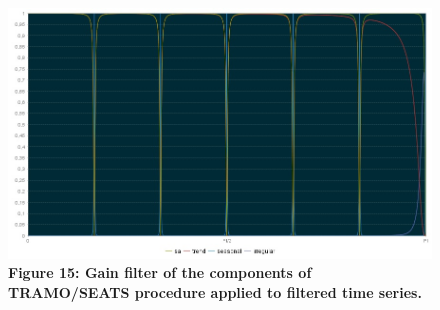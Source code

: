 \documentclass{article}
\begin{document}
\begin{figure}[H]
  \includegraphics[width=\textwidth]{../images/capitolo4/gainfilters.jpg}
  {\textbf{\scriptsize Figure 15: Gain filter of the components of TRAMO/SEATS procedure applied to filtered time series.}}
\end{figure}
\end{document}
